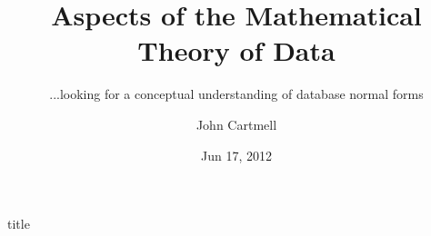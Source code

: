 

\usepackage{mathptmx}
\usepackage{amsfonts}
\usepackage{wasysym}
\usepackage{url}
\usepackage{hyperref}


\newcommand{\sharedmacros}{../../SharedMacros}










\renewcommand{\erpictureFolder}[0]{../../SharedPictures}
\setcounter{equation}{0}


\title[John Cartmell]{Aspects of the Mathematical Theory of Data}
\subtitle{...looking for a conceptual understanding of database normal forms}
\author{John Cartmell}
\date{Jun 17, 2012}

\usepackage{framed}
\usepackage{bibentry}
\usepackage{colortbl}
\usepackage{ulem}   %
\usepackage{listings}
\usepackage{arydshln} %
\usepackage{pst-arrow} %

\nobibliography*



\begin{frame}{title}
\titlepage
\end{frame}

